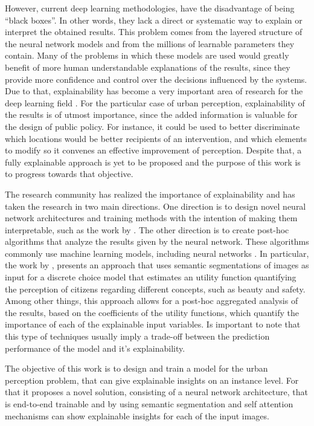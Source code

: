 However, current deep learning methodologies, have the disadvantage of being ``black boxes''. In other
words, they lack a direct or systematic way to explain or interpret the obtained results. This problem
comes from the layered structure of the neural network models and from the millions of learnable parameters
they contain. Many of the problems in which these models are used would greatly benefit of more
human understandable explanations of the results, since they provide more confidence and control
over the decisions influenced by the systems. Due to that, explainability has become a very important area of
research for the deep learning field \cite{adadi_xai, ras_explanation}. For the particular case of urban perception,
explainability of the results is of utmost importance, since the added information is valuable
for the design of public policy. For instance, it could be used to better discriminate which locations
would be better recipients of an intervention, and which elements to modify so it convenes
an effective improvement of perception. Despite that, a fully explainable approach is yet to be
proposed and the purpose of this work is to progress towards that objective.

The research community has realized the importance of explainability
and has taken the research in two main directions. One direction is to design novel
neural network architectures and training methods with the intention of making them interpretable,
such as the work by . The other
direction is to  create post-hoc algorithms \cite{adadi_xai} that analyze the results given by the
neural network. These algorithms commonly use machine learning models, including neural networks \cite{kim_ace}.
In particular, the work by , presents an approach that uses semantic segmentations of  images
\cite{segnet} as input for a discrete choice model that estimates an utility function quantifying the
perception of citizens regarding different concepts, such as beauty and safety.
Among other things, this approach allows for a post-hoc aggregated analysis of the results, based
on the coefficients of the utility functions, which quantify the importance of each of the explainable input variables.
Is important to note that this type of techniques usually imply
a trade-off between the prediction performance of the model
and it's explainability.

The objective of this work is to design and train a model for the urban perception problem,
that can give explainable insights on an instance level. For that it proposes a novel solution,
consisting of a neural network architecture, that is end-to-end trainable and by using semantic
segmentation \cite{pspnet} and self attention mechanisms \cite{vaswani_attention} can show
explainable insights for each of the input images.

